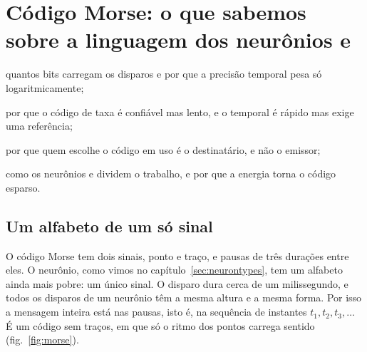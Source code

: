 \chapter{Código Morse: o que sabemos sobre a linguagem dos neurônios  e }
\label{sec:code}
\begin{chaptergoals}
\item quantos bits carregam os disparos e por que a precisão temporal pesa só logaritmicamente;
\item por que o código de taxa é confiável mas lento, e o temporal é rápido mas exige uma referência;
\item por que quem escolhe o código em uso é o destinatário, e não o emissor;
\item como os neurônios  e  dividem o trabalho, e por que a energia torna o código esparso.
\end{chaptergoals}

\section{Um alfabeto de um só sinal}

O código Morse tem dois sinais, ponto e traço, e pausas de três durações entre eles. O neurônio, como vimos no capítulo~\ref{sec:neurontypes}, tem um alfabeto ainda mais pobre: um único sinal. O disparo dura cerca de um milissegundo, e todos os disparos de um neurônio têm a mesma altura e a mesma forma. Por isso a mensagem inteira está nas pausas, isto é, na sequência de instantes $t_1,t_2,t_3,\dots$ É um código sem traços, em que só o ritmo dos pontos carrega sentido (fig.~\ref{fig:morse}).

